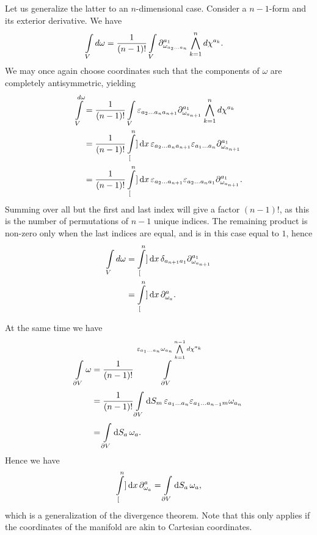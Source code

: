 Let us generalize the latter to an $n$-dimensional case. Consider a $n - 1$-form and its exterior derivative. We have
\begin{align*}
	\int\limits_{V}^{}{d\omega} &= \frac{1}{(n - 1)!}\int\limits_{V}^{}{\partial^{a_{1}}_{\omega_{a_{2}\dots a_{n}}}\bigwedge\limits_{k = 1}^{n}d\chi^{a_{k}}}.
\end{align*}
We may once again choose coordinates such that the components of $\omega$ are completely antisymmetric, yielding
\begin{align*}
	\int\limits_{V}^{d\omega} &= \frac{1}{(n - 1)!}\int\limits_{V}^{}{\varepsilon_{a_{2}\dots a_{n}a_{n + 1}}\partial^{a_{1}}_{\omega_{a_{n + 1}}}\bigwedge\limits_{k = 1}^{n}d\chi^{a_{k}}} \\
	                      &= \frac{1}{(n - 1)!}\int\limits_{[}^{n}]{}{}\dd{x}{\varepsilon_{a_{2}\dots a_{n}a_{n + 1}}\varepsilon_{a_{1}\dots a_{n}}\ensuremath{\partial^{a_{1}}_{\omega_{a_{n + 1}}}}} \\
	                      &= \frac{1}{(n - 1)!}\int\limits_{[}^{n}]{}{}\dd{x}{\varepsilon_{a_{2}\dots a_{n + 1}}\varepsilon_{a_{2}\dots a_{n}a_{1}}\ensuremath{\partial^{a_{1}}_{\omega_{a_{n + 1}}}}}.
\end{align*}
Summing over all but the first and last index will give a factor $(n - 1)!$, as this is the number of permutations of $n - 1$ unique indices. The remaining product is non-zero only when the last indices are equal, and is in this case equal to $1$, hence
\begin{align*}
	\int\limits_{V}^{}{d\omega} &= \int\limits_{[}^{n}]{}{}\dd{x}{\delta_{a_{n + 1}a_{1}}\ensuremath{\partial^{a_{1}}_{\omega_{a_{n + 1}}}}} \\
	                        &= \int\limits_{[}^{n}]{}{}\dd{x}{\ensuremath{\partial^{a}_{\omega_{a}}}}.
\end{align*}

At the same time we have
\begin{align*}
	\int\limits_{\partial V}^{}{\omega} &= \frac{1}{(n - 1)!}\int\limits_{\partial V}^{\varepsilon_{a_{1}\dots a_{n}}\omega_{a_{n}}\bigwedge\limits_{k = 1}^{n - 1}d\chi^{a_{k}}} \\
	                           &= \frac{1}{(n - 1)!}\int\limits_{\partial V}^{}\dd{S_{m}}{\varepsilon_{a_{1}\dots a_{n}}\varepsilon_{a_{1}\dots a_{n - 1}m}\omega_{a_{n}}} \\
	                           &= \int\limits_{\partial V}^{}\dd{S_{a}}{\omega_{a}}.
\end{align*}
Hence we have
\begin{align*}
	\int\limits_{[}^{n}]{}{}\dd{x}{\ensuremath{\partial^{a}_{\omega_{a}}}} = \int\limits_{\partial V}^{}\dd{S_{a}}{\omega_{a}},
\end{align*}
which is a generalization of the divergence theorem. Note that this only applies if the coordinates of the manifold are akin to Cartesian coordinates.